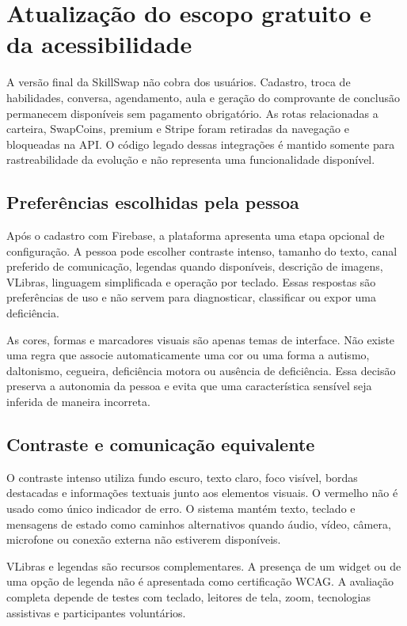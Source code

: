 \chapter{Atualização do escopo gratuito e da acessibilidade}

A versão final da SkillSwap não cobra dos usuários. Cadastro, troca de habilidades, conversa, agendamento, aula e geração do comprovante de conclusão permanecem disponíveis sem pagamento obrigatório. As rotas relacionadas a carteira, SwapCoins, premium e Stripe foram retiradas da navegação e bloqueadas na API. O código legado dessas integrações é mantido somente para rastreabilidade da evolução e não representa uma funcionalidade disponível.

\section{Preferências escolhidas pela pessoa}

Após o cadastro com Firebase, a plataforma apresenta uma etapa opcional de configuração. A pessoa pode escolher contraste intenso, tamanho do texto, canal preferido de comunicação, legendas quando disponíveis, descrição de imagens, VLibras, linguagem simplificada e operação por teclado. Essas respostas são preferências de uso e não servem para diagnosticar, classificar ou expor uma deficiência.

As cores, formas e marcadores visuais são apenas temas de interface. Não existe uma regra que associe automaticamente uma cor ou uma forma a autismo, daltonismo, cegueira, deficiência motora ou ausência de deficiência. Essa decisão preserva a autonomia da pessoa e evita que uma característica sensível seja inferida de maneira incorreta.

\section{Contraste e comunicação equivalente}

O contraste intenso utiliza fundo escuro, texto claro, foco visível, bordas destacadas e informações textuais junto aos elementos visuais. O vermelho não é usado como único indicador de erro. O sistema mantém texto, teclado e mensagens de estado como caminhos alternativos quando áudio, vídeo, câmera, microfone ou conexão externa não estiverem disponíveis.

VLibras e legendas são recursos complementares. A presença de um widget ou de uma opção de legenda não é apresentada como certificação WCAG. A avaliação completa depende de testes com teclado, leitores de tela, zoom, tecnologias assistivas e participantes voluntários.

